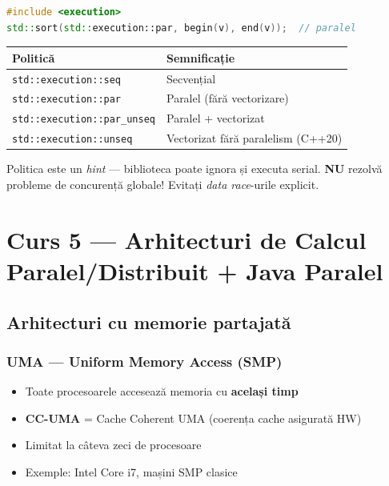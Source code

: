 \documentclass[a4paper,11pt]{article}
\newcommand{\thead}[1]{\cellcolor{tblheader}\color{white}\textbf{#1}}
\begin{document}
\begin{lstlisting}[language=C++]
#include <execution>
std::sort(std::execution::par, begin(v), end(v));  // paralel
\end{lstlisting}

\begin{center}
\begin{tabular}{ll}
\toprule
\thead{Politică} & \thead{Semnificație} \\
\midrule
\lstinline|std::execution::seq| & Secvențial \\
\lstinline|std::execution::par| & Paralel (fără vectorizare) \\
\lstinline|std::execution::par_unseq| & Paralel + vectorizat \\
\lstinline|std::execution::unseq| & Vectorizat fără paralelism (C++20) \\
\bottomrule
\end{tabular}
\end{center}

\begin{tipbox}
Politica este un \emph{hint} — biblioteca poate ignora și executa serial.
\textbf{NU} rezolvă probleme de concurență globale! Evitați \emph{data race}-urile explicit.
\end{tipbox}

\section{Curs 5 — Arhitecturi de Calcul Paralel/Distribuit + Java Paralel}

\subsection{Arhitecturi cu memorie partajată}

\subsubsection{UMA — Uniform Memory Access (SMP)}
\begin{itemize}[noitemsep]
  \item Toate procesoarele accesează memoria cu \textbf{același timp}
  \item \textbf{CC-UMA} = Cache Coherent UMA (coerența cache asigurată HW)
  \item Limitat la câteva zeci de procesoare
  \item Exemple: Intel Core i7, mașini SMP clasice
\end{itemize}
\end{document}
